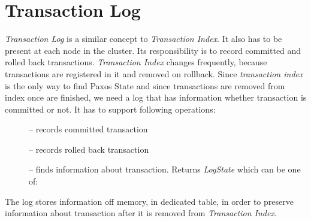 
\section{Transaction Log}
\emph{Transaction Log} is a similar concept to \emph{Transaction Index}. It also has to be present at each node in the cluster. Its responsibility is to record committed and rolled back transactions. \emph{Transaction Index} changes frequently, because transactions are registered in it and removed on rollback. Since \emph{transaction index} is the only way to find Paxos State and since transactions are removed from index once are finished, we need a log that has information whether transaction is committed or not. It has to support following operations:
\begin{description}
\item[] -- records committed transaction
\item[] -- records rolled back transaction
\item[] -- finds information about transaction. Returns \emph{LogState} which can be one of:  
\end{description}
The log stores information off memory, in dedicated table, in order to preserve information about transaction after it is removed from \emph{Transaction Index}.